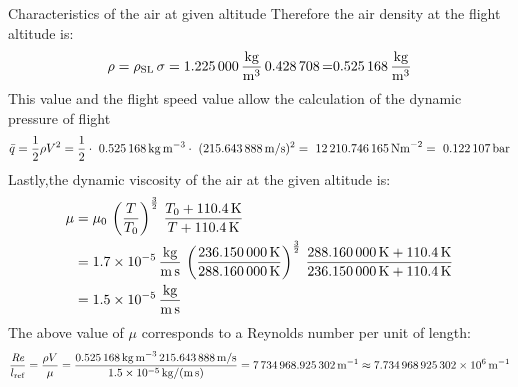 \documentclass[[12pt,twoside]{book}
\begin{document}
\begin{myExampleX}{Characteristics of the air at given altitude}{}
Therefore the air density at the flight altitude is:
\[
\rho = \rho_\text{SL} \, \sigma 
     = \SI[round-precision=3]{\myDensitysealevel}{\si{\frac{kg}{m^{3}}}} \, \SI[round-precision=3]{\myRelativedensity} 
     = \SI[round-precision=3]{\myDensity}{\si{\frac{kg}{m^{3}}}}
\]
%
This value and the flight speed value allow the calculation of the dynamic pressure of flight
\[
\bar{q}=\frac{1}{2} \rho V^{2} =\frac{1}{2}\cdot\ \SI[round-precision=3]{\myDensity}{kg~m^{-3}} \cdot\ (\SI[round-precision=2]{\mySpeedMs}{m/s})^{2} =~\SI[round-precision=2]{\myDynamicpressureNm}{N m^{-2}}=~\SI[round-precision=3]{\myDynamicpressureBar}{bar}
\]
Lastly,the dynamic viscosity of the air at the given  altitude is:
\[
\begin{split}
\mu & {}= \mu_0 \, \left(\frac{T}{T_0}\right)^{\frac{3}{2}} \,                 \frac {T_0 + \SI{110.4}{K}}{T + \SI{110.4}{K}}
    \\
     & {}=\SI[round-precision=1,scientific-notation=true]{\myCone}  {\si {\frac{kg}{m\,s}}}\, \left(\frac{\SI[round-precision=2]{\myTemperatureK}{K}}  {\SI[round-precision=2]{\myTemperaturesealevelK}{K}}
     \right)^{\frac{3}{2}} \,  \frac{\SI[round-precision=2]{\myTemperaturesealevelK}{K} + \SI{110.4}{K}}{\SI[round-precision=2]{\myTemperatureK}{K} + \SI{110.4}{K}}
     \\
     & {}=\SI[round-precision=1,scientific-notation=true]{
     \myDynamicviscosity } {\si {\frac{kg}{m\,s}}}
\end{split}
\]
The above value of $\mu$ corresponds to a Reynolds number per unit of length:
\[
 \frac{\text{\itshape{Re}}}{l_\text{ref}} 
   = \frac{\rho V}{\mu}
   = \frac{
     \SI[round-precision=3]{\myDensity}{kg\,m^{-3}}\,
       \SI[round-precision=2]{\mySpeedMs}{m/s}
       }{
         \SI[round-precision=2,scientific-notation=true]{\myDynamicviscosity}{kg/(m\,s)}
       }
 = \SI[round-precision=0]{\myReynoldsnumeberperunitoflenght}{m^{-1}}
 \approx \SI[scientific-notation=engineering,round-precision=2]{\myReynoldsnumeberperunitoflenght}{m^{-1}}
\]
\end{myExampleX}
\end{document}
